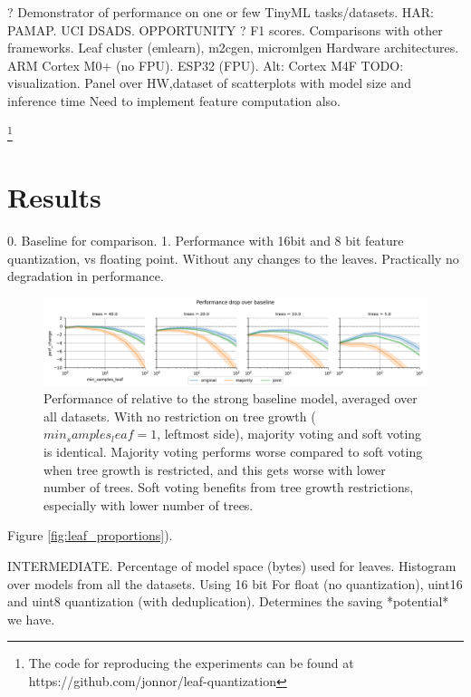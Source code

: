 \documentclass{article}
\begin{document}
? Demonstrator of performance on one or few TinyML tasks/datasets.
HAR: PAMAP. UCI DSADS. OPPORTUNITY ? F1 scores. 
Comparisons with other frameworks. Leaf cluster (emlearn), m2cgen, micromlgen
Hardware architectures. ARM Cortex M0+ (no FPU). ESP32 (FPU). Alt: Cortex M4F
TODO: visualization. Panel over HW,dataset of scatterplots with model size and inference time
Need to implement feature computation also.

\footnote{The code for reproducing the experiments can be found at https://github.com/jonnor/leaf-quantization}

\newpage
\section{Results}

0. Baseline for comparison.
1. Performance with 16bit and 8 bit feature quantization, vs floating point.
Without any changes to the leaves.
Practically no degradation in performance.

\begin{figure}[h!]
\begin{center}
  \includegraphics[width=0.98\linewidth]{reports/figures/hyperparam-perfdrop-trees-strategies.png}
  \end{center}
  \caption{ Performance of relative to the strong baseline model, averaged over all datasets. With no restriction on tree growth ($min_samples_leaf=1$, leftmost side), majority voting and soft voting is identical. Majority voting performs worse compared to soft voting when tree growth is restricted, and this gets worse with lower number of trees. Soft voting benefits from tree growth restrictions, especially with lower number of trees. }
  \label{fig:hyperparameter_strategies}
\end{figure}


Figure \ref{fig:leaf_proportions}). 

INTERMEDIATE. Percentage of model space (bytes) used for leaves.
Histogram over models from all the datasets. Using 16 bit 
For float (no quantization), uint16 and uint8 quantization (with deduplication).
Determines the saving *potential* we have.
\end{document}
